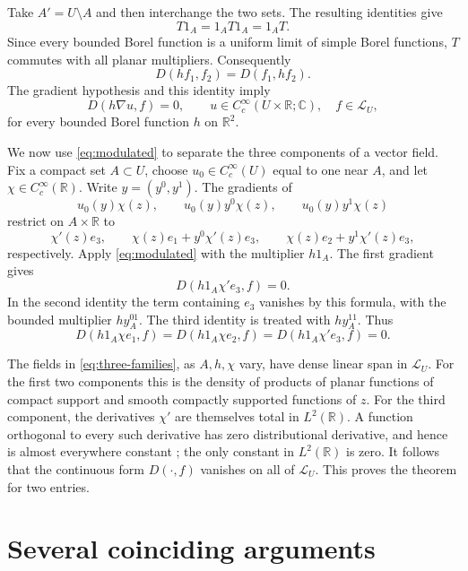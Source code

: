 \documentclass[11pt,letterpaper,reqno]{amsart}
\theoremstyle{definition}
\theoremstyle{remark}
\newcommand{\R}{\mathbb R}
\newcommand{\C}{\mathbb C}
\begin{document}
Take $A'=U\setminus A$ and then interchange the two sets. The resulting
identities give
\[
 T1_A=1_AT1_A=1_AT.
\]
Since every bounded Borel function is a uniform limit of simple Borel
functions, $T$ commutes with all planar multipliers. Consequently
\begin{equation}\label{eq:balance}
 D(hf_1,f_2)=D(f_1,hf_2).
\end{equation}
The gradient hypothesis and this identity imply
\begin{equation}\label{eq:modulated}
 D(h\nabla u,f)=0,
 \qquad u\in C_c^\infty(U\times\R;\C),\quad f\in\mathcal L_U,
\end{equation}
for every bounded Borel function $h$ on $\R^2$.

We now use \eqref{eq:modulated} to separate the three components of a vector
field. Fix a compact set $A\subset U$, choose $u_0\in C_c^\infty(U)$ equal
to one near $A$, and let $\chi\in C_c^\infty(\R)$. Write $y=(y^0,y^1)$.
The gradients of
\[
 u_0(y)\chi(z),\qquad
 u_0(y)y^0\chi(z),\qquad
 u_0(y)y^1\chi(z)
\]
restrict on $A\times\R$ to
\[
 \chi'(z)e_3,\qquad
 \chi(z)e_1+y^0\chi'(z)e_3,\qquad
 \chi(z)e_2+y^1\chi'(z)e_3,
\]
respectively. Apply \eqref{eq:modulated} with the multiplier $h1_A$.
The first gradient gives
\[
 D(h1_A\chi'e_3,f)=0.
\]
In the second identity the term containing $e_3$ vanishes by this formula,
with the bounded multiplier $hy^01_A$. The third identity is treated with
$hy^11_A$. Thus
\begin{equation}\label{eq:three-families}
 D(h1_A\chi e_1,f)=D(h1_A\chi e_2,f)
                  =D(h1_A\chi'e_3,f)=0.
\end{equation}

The fields in \eqref{eq:three-families}, as $A,h,\chi$ vary, have dense
linear span in $\mathcal L_U$. For the first two components this is the
density of products of planar functions of compact support and smooth
compactly supported functions of $z$. For the third component, the
derivatives $\chi'$ are themselves total in $L^2(\R)$. A function
orthogonal to every such derivative has zero distributional derivative,
and hence is almost everywhere constant
\cite[Proposition 1.4.8]{Gerard}; the only constant in $L^2(\R)$
is zero. It follows that the continuous form $D(\cdot,f)$ vanishes on all
of $\mathcal L_U$. This proves the theorem for two entries.

\section{Several coinciding arguments}
\end{document}
